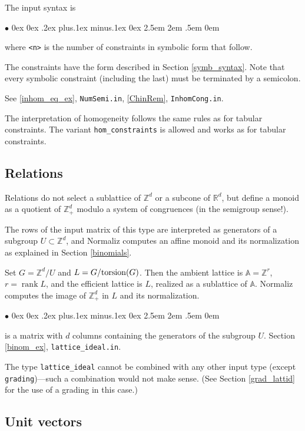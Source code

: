 \documentclass[12pt,a4paper]{scrartcl}
\newcommand{\stdli}{ \topsep0ex \partopsep0ex %
\parsep.2ex plus.1ex minus.1ex \itemsep0ex%
\leftmargin2.5em \labelwidth2em \labelsep.5em \rightmargin0em}%
\renewenvironment{itemize}{\begin{list}{{$\bullet$}}{\stdli}}{\end{list}}
\theoremstyle{definition}
\def\ZZ{{\mathbb Z}}
\def\RR{{\mathbb R}}
\def\AA{{\mathbb A}}
\DeclareMathOperator{\rank}{rank}
\def\itemtt[#1]{\item[\textbf{\ttt{#1}}]}
\def\ttt{\texttt}
\begin{document}
The input syntax is

\begin{itemize}
	\itemtt[constraints <n> symbolic] where \verb|<n>| is the number of constraints in symbolic form that follow.
\end{itemize}

The constraints have the form described in Section \ref{symb_syntax}. Note that every symbolic constraint (including the last) must be terminated by a semicolon.

See \ref{inhom_eq_ex}, \verb|NumSemi.in|, \ref{ChinRem}, \verb|InhomCong.in|.

The interpretation of homogeneity follows the same rules as for tabular constraints. The variant \verb|hom_constraints| is allowed and works as for tabular constraints.


\subsection{Relations}\label{relations}

Relations do not select a
sublattice of $\ZZ^d$ or a subcone of $\RR^d$, but define a
monoid as a quotient of $\ZZ_+^d$ modulo a system of
congruences (in the semigroup sense!).

The rows of the input matrix of this type are interpreted as
generators of a subgroup $U\subset\ZZ^d$, and Normaliz computes an affine monoid and its normalization  as explained in Section \ref{binomials}.

Set $G=\ZZ^d/U$ and $L=G/\textup{torsion}(G)$. Then the ambient lattice
is $\AA=\ZZ^r$, $r=\rank L$, and the efficient lattice is $L$, realized
as a sublattice of $\AA$. Normaliz computes the image of $\ZZ^d_+$ in $L$ and its normalization.

\begin{itemize}
	\itemtt[lattice\_ideal] is a matrix with $d$ columns containing the generators of the subgroup $U$. Section \ref{binom_ex}, \verb|lattice_ideal.in|.
\end{itemize}

The type \ttt{lattice\_ideal} cannot be combined with any other input type (except
\ttt{grading})---such a combination would not make sense. (See Section \ref{grad_lattid} for the use of a grading in this case.)

\subsection{Unit vectors}\label{unit_vectors}
\end{document}
